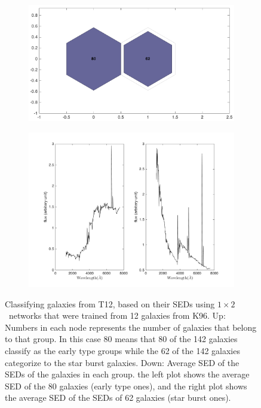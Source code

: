             \begin{figure}
                \begin{subfigure}[b]{0.5\textwidth}
                    \centering
                    \includegraphics[width=\textwidth]{../images/1d/hit_v_1_by_2.png}
                \end{subfigure}
                \hfill
                \begin{subfigure}[b]{0.55\textwidth}
                     \includegraphics[width=\textwidth]{../images/1d/SED_total1by2.png}
                \end{subfigure}
                \caption{Classifying galaxies from T12, based on their SEDs using $1\times2$~networks that were trained from 12 galaxies from K96. Up: Numbers in each node represents the number of galaxies that belong to that group. In this case 80 means that 80 of the 142 galaxies classify as the early type groups while the 62 of the 142 galaxies categorize to the star burst galaxies. Down: Average SED of the SEDs of the galaxies in each group. the left plot shows the average SED of the 80 galaxies (early type ones), and the right plot shows the average SED of the SEDs of 62 galaxies (star burst ones).}
                \label{fig: 1by2V}
            \end{figure}            
